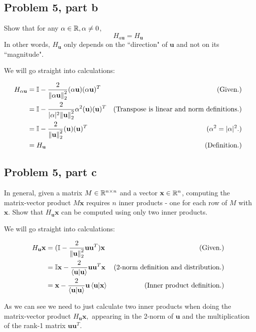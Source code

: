 \newpage
\subsection{Problem 5, part b}
Show that for any $\alpha \in \mathbb{R}, \alpha \neq 0$,
\[
H_{a\textbf{u}} = H_\textbf{u}
\]
In other words, $H_\textbf{u}$ only depends on the ``direction" of $\textbf{u}$ and not on its ``magnitude".
\partbreak

\begin{solution}

    We will go straight into calculations:

    \alignbreak
    \begin{align*}
        H_{\alpha\textbf{u}} &= \mathbb{I} - \frac{2}{\norm{\alpha\textbf{u}}_2^2}(\alpha\textbf{u})(\alpha\textbf{u})^T &\text{(Given.)}\\
        &= \mathbb{I} - \frac{2}{|\alpha|^2\norm{\textbf{u}}_2^2}\alpha^2(\textbf{u})(\textbf{u})^T &\text{(Transpose is linear and norm definitions.)}\\
        &= \mathbb{I} - \frac{2}{\norm{\textbf{u}}_2^2}(\textbf{u})(\textbf{u})^T &\text{($\alpha^2 = |\alpha|^2$.)}\\
        &= H_\textbf{u} &\text{(Definition.)}
    \end{align*}
    \alignbreak
\end{solution}

\newpage
\subsection{Problem 5, part c}
In general, given a matrix $M \in \mathbb{R}^{n\times n}$ and a vector $\textbf{x}\in \mathbb{R}^n$, computing the matrix-vector product $M\textbf{x}$ requires $n$ inner products - one for each row of $M$ with $\textbf{x}$. Show that $H_\textbf{u}\textbf{x}$ can be computed using only two inner products.
\partbreak
\begin{solution}

    We will go straight into calculations:

    \alignbreak
    \begin{align*}
        H_\textbf{u}\textbf{x} &= (\mathbb{I} - \frac{2}{\norm{\textbf{u}}_2^2}\textbf{u}\textbf{u}^T)\textbf{x} &\text{(Given.)}\\
        &= \mathbb{I}\textbf{x} - \frac{2}{\braket{\textbf{u}}{\textbf{u}}}\textbf{u}\textbf{u}^T\textbf{x} &\text{(2-norm definition and distribution.)}\\
        &= \textbf{x} - \frac{2}{\braket{\textbf{u}}{\textbf{u}}}\textbf{u}\braket{\textbf{u}}{\textbf{x}} &\text{(Inner product definition.)}
    \end{align*}
    \alignbreak

    As we can see we need to just calculate two inner products when doing the matrix-vector product $H_\textbf{u}\textbf{x},$ appearing in the 2-norm of $\textbf{u}$ and the multiplication of the rank-1 matrix $\textbf{u}\textbf{u}^T$.
\end{solution}

